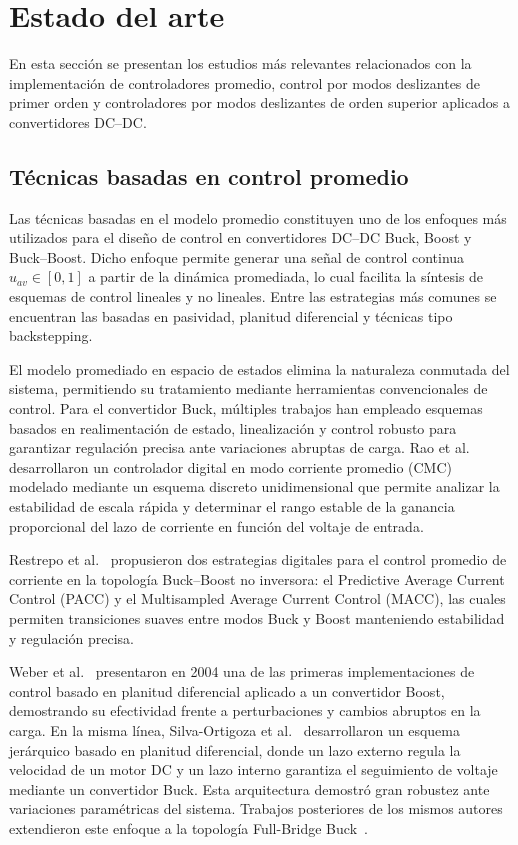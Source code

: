\documentclass[12pt,oneside,openany]{book}
\begin{document}
\section{Estado del arte}

En esta sección se presentan los estudios más relevantes relacionados con la implementación de controladores promedio, control por modos deslizantes de primer orden y controladores por modos deslizantes de orden superior aplicados a convertidores DC–DC.

\subsection{Técnicas basadas en control promedio}

Las técnicas basadas en el modelo promedio constituyen uno de los enfoques más utilizados para el diseño de control en convertidores DC–DC Buck, Boost y Buck–Boost. Dicho enfoque permite generar una señal de control continua \(u_{av} \in [0,1]\) a partir de la dinámica promediada, lo cual facilita la síntesis de esquemas de control lineales y no lineales. Entre las estrategias más comunes se encuentran las basadas en pasividad, planitud diferencial y técnicas tipo backstepping.

El modelo promediado en espacio de estados elimina la naturaleza conmutada del sistema, permitiendo su tratamiento mediante herramientas convencionales de control. Para el convertidor Buck, múltiples trabajos han empleado esquemas basados en realimentación de estado, linealización y control robusto para garantizar regulación precisa ante variaciones abruptas de carga. Rao et al.~\cite{ea_1} desarrollaron un controlador digital en modo corriente promedio (CMC) modelado mediante un esquema discreto unidimensional que permite analizar la estabilidad de escala rápida y determinar el rango estable de la ganancia proporcional del lazo de corriente en función del voltaje de entrada.

Restrepo et al.~\cite{ea_2} propusieron dos estrategias digitales para el control promedio de corriente en la topología Buck–Boost no inversora: el Predictive Average Current Control (PACC) y el Multisampled Average Current Control (MACC), las cuales permiten transiciones suaves entre modos Buck y Boost manteniendo estabilidad y regulación precisa.

Weber et al.~\cite{ea_7} presentaron en 2004 una de las primeras implementaciones de control basado en planitud diferencial aplicado a un convertidor Boost, demostrando su efectividad frente a perturbaciones y cambios abruptos en la carga. En la misma línea, Silva-Ortigoza et al.~\cite{ea_3} desarrollaron un esquema jerárquico basado en planitud diferencial, donde un lazo externo regula la velocidad de un motor DC y un lazo interno garantiza el seguimiento de voltaje mediante un convertidor Buck. Esta arquitectura demostró gran robustez ante variaciones paramétricas del sistema. Trabajos posteriores de los mismos autores extendieron este enfoque a la topología Full-Bridge Buck~\cite{ea_4}.
\end{document}
